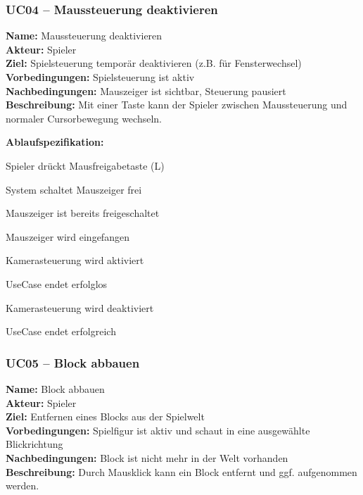 \documentclass{article}
\begin{document}
\newpage

\subsubsection*{UC04 – Maussteuerung deaktivieren}

\textbf{Name:} Maussteuerung deaktivieren \\
\textbf{Akteur:} Spieler \\
\textbf{Ziel:} Spielsteuerung temporär deaktivieren (z.B. für Fensterwechsel) \\
\textbf{Vorbedingungen:} Spielsteuerung ist aktiv \\
\textbf{Nachbedingungen:} Mauszeiger ist sichtbar, Steuerung pausiert \\
\textbf{Beschreibung:} Mit einer Taste kann der Spieler zwischen Maussteuerung und normaler Cursorbewegung wechseln.

\textbf{Ablaufspezifikation:}
\begin{description}[style=nextline,leftmargin=1.9cm,labelwidth=1.6cm]
  \item[1.] Spieler drückt Mausfreigabetaste (L)
  \item[2.] System schaltet Mauszeiger frei
  \item[2a.] Mauszeiger ist bereits freigeschaltet
  \item[2a.1.] Mauszeiger wird eingefangen
  \item[2a.2.] Kamerasteuerung wird aktiviert
  \item[2a.3.] UseCase endet erfolglos
  \item[3.] Kamerasteuerung wird deaktiviert
  \item[4.] UseCase endet erfolgreich
\end{description}

\newpage

\subsubsection*{UC05 – Block abbauen}

\textbf{Name:} Block abbauen \\
\textbf{Akteur:} Spieler \\
\textbf{Ziel:} Entfernen eines Blocks aus der Spielwelt \\
\textbf{Vorbedingungen:} Spielfigur ist aktiv und schaut in eine ausgewählte Blickrichtung \\
\textbf{Nachbedingungen:} Block ist nicht mehr in der Welt vorhanden \\
\textbf{Beschreibung:} Durch Mausklick kann ein Block entfernt und ggf. aufgenommen werden.
\end{document}
